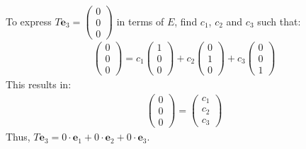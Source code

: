 \begin{enumerate}
\begin{enumerate}[label={(\alph*)}]
    To express $T \mathbf{e}_3 = \begin{pmatrix} 0 \\ 0 \\ 0 \end{pmatrix}$ in terms of $E$, find $c_1$, $c_2$ and $c_3$ such that:
    \begin{align*}
        \begin{pmatrix} 0 \\ 0 \\ 0 \end{pmatrix} = c_1 \begin{pmatrix} 1 \\ 0 \\ 0 \end{pmatrix} + c_2 \begin{pmatrix} 0 \\ 1 \\ 0 \end{pmatrix} + c_3 \begin{pmatrix} 0 \\ 0 \\ 1 \end{pmatrix}
    \end{align*}
    This results in:
    \begin{align*}
        \begin{pmatrix} 0 \\ 0 \\ 0 \end{pmatrix} = \begin{pmatrix} c_1 \\ c_2 \\ c_3 \end{pmatrix}
    \end{align*}
    Thus, $T \mathbf{e}_3 = 0 \cdot \mathbf{e}_1 + 0 \cdot \mathbf{e}_2 + 0 \cdot \mathbf{e}_3$.
    

\end{enumerate}
\end{enumerate}
